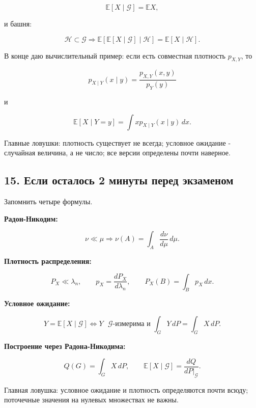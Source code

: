 \documentclass[
  11pt,
  a4paper,
]{article}
\begin{document}
\[
\mathbb E[X\mid\mathcal G]=\mathbb EX,
\]

и башня:

\[
\mathcal H\subset\mathcal G
\Rightarrow
\mathbb E[\mathbb E[X\mid\mathcal G]\mid\mathcal H]
=
\mathbb E[X\mid\mathcal H].
\]

В конце даю вычислительный пример: если есть совместная плотность
\(p_{X,Y}\), то

\[
p_{X\mid Y}(x\mid y)=\frac{p_{X,Y}(x,y)}{p_Y(y)}
\]

и

\[
\mathbb E[X\mid Y=y]=\int x p_{X\mid Y}(x\mid y)\,dx.
\]

Главные ловушки: плотность существует не всегда; условное ожидание -
случайная величина, а не число; все версии определены почти наверное.

\subsection{15. Если осталось 2 минуты перед
экзаменом}\label{ux435ux441ux43bux438-ux43eux441ux442ux430ux43bux43eux441ux44c-2-ux43cux438ux43dux443ux442ux44b-ux43fux435ux440ux435ux434-ux44dux43aux437ux430ux43cux435ux43dux43eux43c}

Запомнить четыре формулы.

\textbf{Радон-Никодим:}

\[
\nu\ll\mu
\Rightarrow
\nu(A)=\int_A\frac{d\nu}{d\mu}\,d\mu.
\]

\textbf{Плотность распределения:}

\[
P_X\ll\lambda_n,
\qquad
p_X=\frac{dP_X}{d\lambda_n},
\qquad
P_X(B)=\int_Bp_X\,dx.
\]

\textbf{Условное ожидание:}

\[
Y=\mathbb E[X\mid\mathcal G]
\iff
Y\text{ }\mathcal G\text{-измерима и }
\int_GY\,dP=\int_GX\,dP.
\]

\textbf{Построение через Радона-Никодима:}

\[
Q(G)=\int_GX\,dP,
\qquad
\mathbb E[X\mid\mathcal G]=\frac{dQ}{dP|_{\mathcal G}}.
\]

Главная ловушка: условное ожидание и плотность определяются почти всюду;
поточечные значения на нулевых множествах не важны.

\newpage
\end{document}
